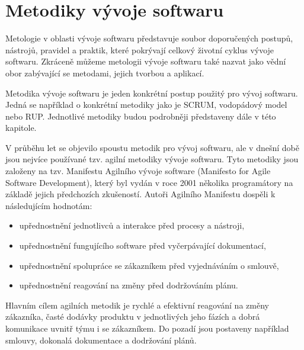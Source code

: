 \documentclass[czech,DP]{thesiskiv}
\begin{document}
\section{Metodiky vývoje softwaru}
Metologie v oblasti vývoje softwaru představuje soubor doporučených postupů, nástrojů, pravidel a praktik, které pokrývají celkový životní cyklus vývoje softwaru. Zkráceně můžeme metologii vývoje softwaru také nazvat jako vědní obor zabývající se metodami, jejich tvorbou a aplikací. 
\par
Metodika vývoje softwaru je jeden konkrétní postup použitý pro vývoj softwaru. Jedná se například o konkrétní metodiky jako je SCRUM, vodopádový model nebo RUP. Jednotlivé metodiky budou podrobněji představeny dále v této kapitole.
\par
V průběhu let se objevilo spoustu metodik pro vývoj softwaru, ale v dnešní době jsou nejvíce používané tzv. agilní metodiky vývoje softwaru. Tyto metodiky jsou založeny na tzv. Manifestu Agilního vývoje software (Manifesto for Agile Software Development), který byl vydán v roce 2001 několika programátory na základě jejich předchozích zkušeností. Autoři Agilního Manifestu dospěli k následujícím hodnotám:
\begin{itemize}
    \item upřednostnění jednotlivců a interakce před procesy a nástroji,
    \item upřednostnění fungujícího software před vyčerpávající dokumentací,
    \item upřednostnění spolupráce se zákazníkem před vyjednáváním o smlouvě,
    \item upřednostnění reagování na změny před dodržováním plánu. \cite{AgileManifest}
\end{itemize}
Hlavním cílem agilních metodik je rychlé a efektivní reagování na změny zákazníka, časté dodávky produktu v jednotlivých jeho fázích a dobrá komunikace uvnitř týmu i se zákazníkem. Do pozadí jsou postaveny například smlouvy, dokonalá dokumentace a dodržování plánů.
\end{document}
